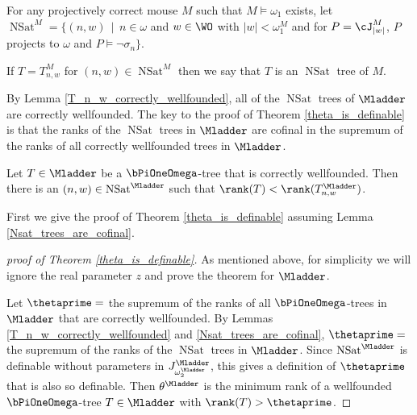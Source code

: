 \documentclass[oneside,12pt]{amsart}
\DeclareMathOperator{\NSat}{NSat}
\begin{document}
\begin{definition}
For any projectively correct mouse $M$ such that $M\models \omega_1$ exists,
let $\NSat^M=\big\{ (n,w) \, \mid \, n\in\omega$ and $w\in\WO$ with $|w|<\omega_1^{M}$ and
for $P=\cJ^M_{|w|}$, $P$ projects to $\omega$ and $P\models \neg \sigma_n \big\}$.

If $T=T^M_{n,w}$ for $(n,w)\in\NSat^M$ then we say that $T$ is an $\NSat$ tree of $M$.
\end{definition}

By Lemma \ref{T_n_w_correctly_wellfounded}, all of the $\NSat$ trees of $\Mladder$
are correctly wellfounded. The key to the proof of Theorem
 \ref{theta_is_definable} is that the ranks of the $\NSat$ trees in $\Mladder$ are cofinal
 in the supremum of the ranks of all correctly wellfounded trees in $\Mladder$.

\begin{lemma}
\label{Nsat_trees_are_cofinal}
Let $T\in\Mladder$ be a $\bPiOneOmega$-tree that is correctly wellfounded.
Then there is an $(n,w)\in \NSat^{\Mladder}$ such that $\rank(T) < \rank(T^{\Mladder}_{n,w})$.
\end{lemma}

First we give the proof of Theorem \ref{theta_is_definable} assuming Lemma
\ref{Nsat_trees_are_cofinal}.

\begin{proof}[proof of Theorem \ref{theta_is_definable}]
As mentioned above, for simplicity we will ignore the real parameter $z$ and prove
the theorem for $\Mladder$.

Let $\thetaprime = $ the supremum of the ranks of all $\bPiOneOmega$-trees
in $\Mladder$ that are correctly wellfounded. By Lemmas
\ref{T_n_w_correctly_wellfounded} and \ref{Nsat_trees_are_cofinal}, $\thetaprime =$
the supremum of the ranks of the $\NSat$ trees in $\Mladder$.
Since $\NSat^{\Mladder}$
is definable without parameters in $J^{\Mladder}_{\omega_2^{\Mladder}}$,
this gives a definition of $\thetaprime$ that is also
so definable. Then $\theta^{\Mladder}$ is the minimum rank of a wellfounded
$\bPiOneOmega$-tree $T\in\Mladder$ with $\rank(T)>\thetaprime$.
\end{proof}
\end{document}

